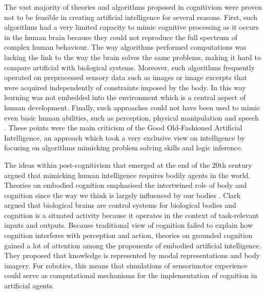 The vast majority of theories and algorithms proposed in cognitivism were 
proven not to be feasible in creating artificial intelligence for several 
reasons. First, such algorithms had a very limited capacity to mimic cognitive 
processing as it occurs in the human brain because they could not reproduce the 
full spectrum of complex human behaviour. The way algorithms performed 
computations was lacking the link to the way the brain solves the same 
problems, 
making it hard to compare artificial with biological systems. 
Moreover, such algorithms frequently operated on preprocessed sensory data such 
as images or image excerpts that were acquired independently of constraints 
imposed by the body. In this way learning was not embedded into the environment 
which is a central aspect of human development. Finally, such approaches could 
not have been used to mimic even basic human abilities, such as perception, 
physical manipulation and speech \citep{Mingers01}. These points were the main 
criticism of the Good Old-Fashioned Artificial Intelligence, an approach which 
took a very exclusive view on intelligence by focusing on algorithms mimicking 
problem solving skills and logic inference.

The ideas within post-cognitivism that emerged at the end of the 20th century 
argued that mimicking human intelligence requires bodily agents in the world. 
Theories on embodied cognition emphasised the intertwined role of body and 
cognition since the way we think is largely influenced by our bodies 
\citep{LakoffJohnson80, varela06, plasticq}. Clark argued that 
biological brains are control systems for biological bodies and cognition is a 
situated activity because it operates in the context of task-relevant inputs 
and outputs. Because traditional view of cognition failed to explain how 
cognition interferes with perception and action, theories on grounded cognition 
gained a lot of attention among the proponents of embodied artificial 
intelligence. They proposed that knowledge is represented by modal 
representations and body imagery. For robotics, this means that simulations of 
sensorimotor experience could serve as computational mechanisms for the 
implementation of cognition in artificial agents.

